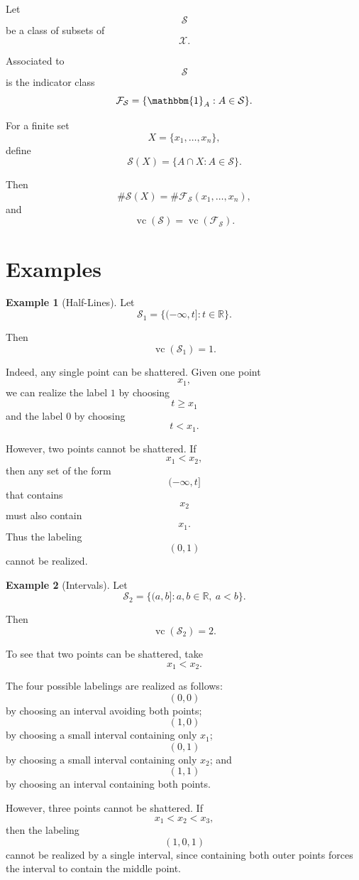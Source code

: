 \documentclass[12pt,oneside]{book}
\numberwithin{equation}{section}
\theoremstyle{definition}
\newtheorem{example}{Example}[section]
\theoremstyle{plain}
\theoremstyle{remark}
\newcommand{\R}{\mathbb{R}}
\newcommand{\ind}{\mathbbm{1}}
\begin{document}
Let
\[
\mathcal{S}
\]
be a class of subsets of
\[
\mathcal{X}.
\]

Associated to
\[
\mathcal{S}
\]
is the indicator class
\[
\mathcal{F}_{\mathcal{S}}
=
\{\ind_A:A\in\mathcal{S}\}.
\]

For a finite set
\[
X=\{x_1,\dots,x_n\},
\]
define
\[
\mathcal{S}(X)
=
\{A\cap X:A\in\mathcal{S}\}.
\]

Then
\[
\#\mathcal{S}(X)
=
\#\mathcal{F}_{\mathcal{S}}(x_1,\dots,x_n),
\]
and
\[
\operatorname{vc}(\mathcal{S})
=
\operatorname{vc}(\mathcal{F}_{\mathcal{S}}).
\]

\section{Examples}

\begin{example}[Half-Lines]
Let
\[
\mathcal{S}_1
=
\{(-\infty,t]:t\in\R\}.
\]

Then
\[
\operatorname{vc}(\mathcal{S}_1)=1.
\]

Indeed, any single point can be shattered. Given one point
\[
x_1,
\]
we can realize the label $1$ by choosing
\[
t\geq x_1
\]
and the label $0$ by choosing
\[
t<x_1.
\]

However, two points cannot be shattered. If
\[
x_1<x_2,
\]
then any set of the form
\[
(-\infty,t]
\]
that contains
\[
x_2
\]
must also contain
\[
x_1.
\]
Thus the labeling
\[
(0,1)
\]
cannot be realized.
\end{example}

\begin{example}[Intervals]
Let
\[
\mathcal{S}_2
=
\{(a,b]:a,b\in\R,\ a<b\}.
\]

Then
\[
\operatorname{vc}(\mathcal{S}_2)=2.
\]

To see that two points can be shattered, take
\[
x_1<x_2.
\]

The four possible labelings are realized as follows:
\[
(0,0)
\]
by choosing an interval avoiding both points;
\[
(1,0)
\]
by choosing a small interval containing only $x_1$;
\[
(0,1)
\]
by choosing a small interval containing only $x_2$;
and
\[
(1,1)
\]
by choosing an interval containing both points.

However, three points cannot be shattered. If
\[
x_1<x_2<x_3,
\]
then the labeling
\[
(1,0,1)
\]
cannot be realized by a single interval, since containing both outer points forces the interval to contain the middle point.
\end{example}
\end{document}
